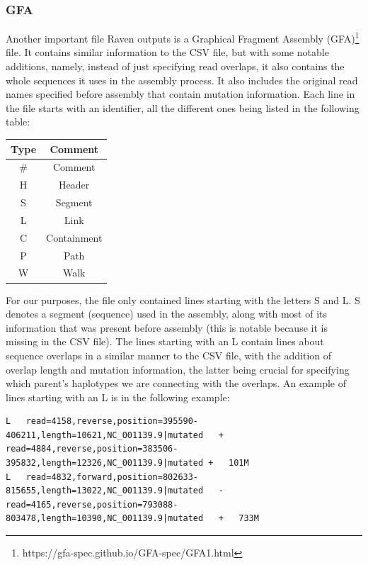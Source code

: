 \documentclass[times, utf8, diplomski, english]{fer_eng}
\begin{document}
\subsubsection{GFA}
\label{subsubsec:gfa}

Another important file Raven outputs is a Graphical Fragment Assembly (GFA)\footnote{https://gfa-spec.github.io/GFA-spec/GFA1.html} file. It contains similar information to the CSV file, but with some notable additions, namely, instead of just specifying read overlaps, it also contains the whole sequences it uses in the assembly process. It also includes the original read names specified before assembly that contain mutation information. Each line in the file starts with an identifier, all the different ones being listed in the following table:

\begin{center}
	\begin{tabular}{ |c|c| }
		\hline
		\textbf{Type} & \textbf{Comment} \\
		\hline
		\# & Comment \\
		\hline
		H & Header \\
		\hline
		S & Segment \\
		\hline
		L & Link \\
		\hline
		C & Containment \\
		\hline
		P & Path \\
		\hline
		W & Walk \\
		\hline
	\end{tabular}
\end{center}

For our purposes, the file only contained lines starting with the letters S and L. S denotes a segment (sequence) used in the assembly, along with most of its information that was present before assembly (this is notable because it is missing in the CSV file). The lines starting with an L contain lines about sequence overlaps in a similar manner to the CSV file, with the addition of overlap length and mutation information, the latter being crucial for specifying which parent's haplotypes we are connecting with the overlaps. An example of lines starting with an L is in the following example:

\begin{lstlisting}
L	read=4158,reverse,position=395590-406211,length=10621,NC_001139.9|mutated	+ read=4884,reverse,position=383506-395832,length=12326,NC_001139.9|mutated	+	101M
L	read=4832,forward,position=802633-815655,length=13022,NC_001139.9|mutated	-	read=4165,reverse,position=793088-803478,length=10390,NC_001139.9|mutated	+	733M
\end{lstlisting}
\end{document}
